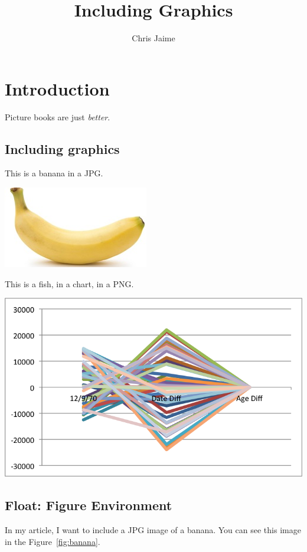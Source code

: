 \documentclass{proc}
\title{Including Graphics}
\author{Chris Jaime}
\date{}
\begin{document}
\maketitle

\section{Introduction}

Picture books are just \emph{better}.

\subsection{Including graphics}

This is a banana in a JPG.

\vspace{0.5cm} %

\includegraphics[scale=0.5]{Banana.jpg}

This is a fish, in a chart, in a PNG.

\vspace{0.5cm} %

\includegraphics[scale=0.5]{Fish.png}

\subsection{Float: Figure Environment}
In my article, I want to include a JPG image of a banana. You can see this image in the Figure~\ref{fig:banana}.
\end{document}
